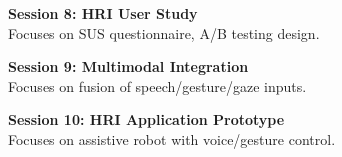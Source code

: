 \vspace{0.2cm}

\noindent\textbf{Session 8: HRI User Study} \\
Focuses on SUS questionnaire, A/B testing design.

\vspace{0.2cm}

\noindent\textbf{Session 9: Multimodal Integration} \\
Focuses on fusion of speech/gesture/gaze inputs.

\vspace{0.2cm}

\noindent\textbf{Session 10: HRI Application Prototype} \\
Focuses on assistive robot with voice/gesture control.

\vspace{0.2cm}

\newpage
{}
